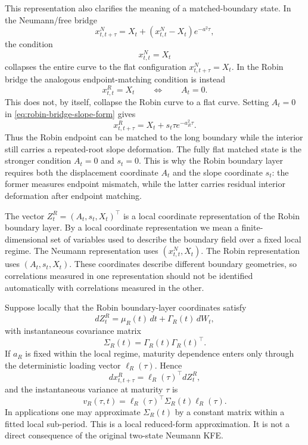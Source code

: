 \documentclass[11pt]{article}
\numberwithin{equation}{section}
\begin{document}
This representation also clarifies the meaning of a matched-boundary state. In the Neumann/free bridge
\[
        x^N_{t,t+\tau}=X_t+(x^N_{t,t}-X_t)e^{-a^2\tau},
\]
the condition
\[
        x^N_{t,t}=X_t
\]
collapses the entire curve to the flat configuration \(x^N_{t,t+\tau}=X_t\). In the Robin bridge the analogous endpoint-matching condition is instead
\begin{equation}
\label{eq:robin-matched-boundary-A-zero}
        x^R_{t,t}=X_t
        \qquad\Longleftrightarrow\qquad
        A_t=0.
\end{equation}
This does not, by itself, collapse the Robin curve to a flat curve. Setting \(A_t=0\) in \eqref{eq:robin-bridge-slope-form} gives
\begin{equation}
\label{eq:robin-A-zero-interior-deformation}
        x^R_{t,t+\tau}
        =
        X_t+s_t\tau e^{-a_R^2\tau}.
\end{equation}
Thus the Robin endpoint can be matched to the long boundary while the interior still carries a repeated-root slope deformation. The fully flat matched state is the stronger condition \(A_t=0\) and \(s_t=0\). This is why the Robin boundary layer requires both the displacement coordinate \(A_t\) and the slope coordinate \(s_t\): the former measures endpoint mismatch, while the latter carries residual interior deformation after endpoint matching.

The vector \(Z^R_t=(A_t,s_t,X_t)^\top\) is a local coordinate representation of the Robin boundary layer. By a local coordinate representation we mean a finite-dimensional set of variables used to describe the boundary field over a fixed local regime. The Neumann representation uses \((x^N_{t,t},X_t)\). The Robin representation uses \((A_t,s_t,X_t)\). These coordinates describe different boundary geometries, so correlations measured in one representation should not be identified automatically with correlations measured in the other.

Suppose locally that the Robin boundary-layer coordinates satisfy
\begin{equation}
\label{eq:ZR-local-SDE}
        dZ^R_t=\mu_R(t)\,dt+\Gamma_R(t)\,dW_t,
\end{equation}
with instantaneous covariance matrix
\begin{equation}
\label{eq:SigmaR-local}
        \Sigma_R(t)=\Gamma_R(t)\Gamma_R(t)^\top.
\end{equation}
If \(a_R\) is fixed within the local regime, maturity dependence enters only through the deterministic loading vector \(\ell_R(\tau)\). Hence
\begin{equation}
\label{eq:dxR-projection-local}
        dx^R_{t,t+\tau}
        =
        \ell_R(\tau)^\top dZ^R_t,
\end{equation}
and the instantaneous variance at maturity \(\tau\) is
\begin{equation}
\label{eq:vR-projected-local}
        v_R(\tau,t)
        =
        \ell_R(\tau)^\top\Sigma_R(t)\ell_R(\tau).
\end{equation}
In applications one may approximate \(\Sigma_R(t)\) by a constant matrix within a fitted local sub-period. This is a local reduced-form approximation. It is not a direct consequence of the original two-state Neumann KFE.
\end{document}
